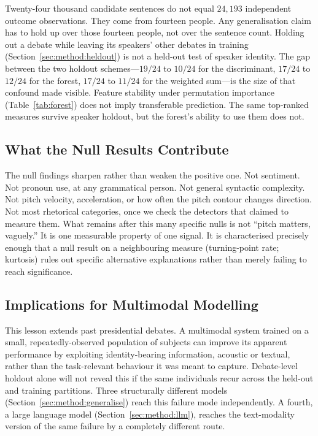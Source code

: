 \documentclass[pdflatex,sn-mathphys-num]{sn-jnl}%
\begin{document}
Twenty-four thousand candidate sentences do not equal $24{,}193$ independent
outcome observations. They come from fourteen people. Any
generalisation claim has to hold up over those fourteen people, not over
the sentence count. Holding out a debate while leaving its speakers' other
debates in training (Section~\ref{sec:method:heldout}) is not a held-out
test of speaker identity. The gap between the two holdout schemes---$19/24$
to $10/24$ for the discriminant, $17/24$ to $12/24$ for the forest, $17/24$
to $11/24$ for the weighted sum---is the size of that confound made
visible. Feature stability under permutation importance
(Table~\ref{tab:forest}) does not imply transferable prediction. The same
top-ranked measures survive speaker holdout, but the forest's ability to
use them does not.

\subsection{What the Null Results Contribute}
\label{sec:disc:nulls}

The null findings sharpen rather than weaken the positive one. Not
sentiment. Not pronoun use, at any grammatical person. Not general
syntactic complexity. Not pitch velocity, acceleration, or how often the
pitch contour changes direction. Not most rhetorical categories, once we
check the detectors that claimed to measure them. What remains after this
many specific nulls is not ``pitch matters, vaguely.'' It is one measurable
property of one signal. It is characterised precisely enough that a null result
on a neighbouring measure (turning-point rate; kurtosis) rules out specific
alternative explanations rather than merely failing to reach significance.

\subsection{Implications for Multimodal Modelling}
\label{sec:disc:multimodal}

This lesson extends past presidential debates. A multimodal system trained
on a small, repeatedly-observed population of subjects can improve its
apparent performance by exploiting identity-bearing information, acoustic
or textual, rather than the task-relevant behaviour it was meant to
capture. Debate-level holdout alone will not reveal this if the same
individuals recur across the held-out and training partitions. Three
structurally different models (Section~\ref{sec:method:generalise}) reach
this failure mode independently. A fourth, a large language model
(Section~\ref{sec:method:llm}), reaches the text-modality version of the
same failure by a completely different route.
\end{document}
